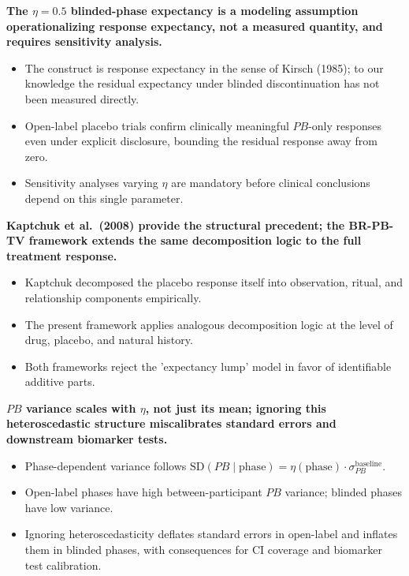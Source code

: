 \documentclass[
  11pt,
]{article}
\begin{document}
\textbf{The $\eta = 0.5$ blinded-phase expectancy is a modeling assumption operationalizing response expectancy, not a measured quantity, and requires sensitivity analysis.}

\begin{itemize}\setlength{\itemsep}{2pt}\setlength{\parskip}{0pt}
\item The construct is response expectancy in the sense of Kirsch (1985); to our knowledge the residual expectancy under blinded discontinuation has not been measured directly.
\item Open-label placebo trials confirm clinically meaningful $PB$-only responses even under explicit disclosure, bounding the residual response away from zero.
\item Sensitivity analyses varying $\eta$ are mandatory before clinical conclusions depend on this single parameter.
\end{itemize}

\textbf{Kaptchuk et al.\ (2008) provide the structural precedent; the BR-PB-TV framework extends the same decomposition logic to the full treatment response.}

\begin{itemize}\setlength{\itemsep}{2pt}\setlength{\parskip}{0pt}
\item Kaptchuk decomposed the placebo response itself into observation, ritual, and relationship components empirically.
\item The present framework applies analogous decomposition logic at the level of drug, placebo, and natural history.
\item Both frameworks reject the 'expectancy lump' model in favor of identifiable additive parts.
\end{itemize}

\textbf{$PB$ variance scales with $\eta$, not just its mean; ignoring this heteroscedastic structure miscalibrates standard errors and downstream biomarker tests.}

\begin{itemize}\setlength{\itemsep}{2pt}\setlength{\parskip}{0pt}
\item Phase-dependent variance follows $\mathrm{SD}(PB \mid \text{phase}) = \eta(\text{phase}) \cdot \sigma_{PB}^{\text{baseline}}$.
\item Open-label phases have high between-participant $PB$ variance; blinded phases have low variance.
\item Ignoring heteroscedasticity deflates standard errors in open-label and inflates them in blinded phases, with consequences for CI coverage and biomarker test calibration.
\end{itemize}
\end{document}
